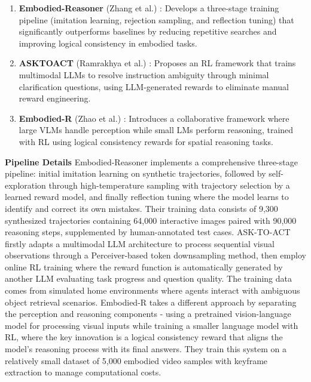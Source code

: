 \documentclass[10pt,twocolumn]{article}
\begin{document}
\begin{enumerate}[leftmargin=*,noitemsep,topsep=0pt]
    \item \textbf{Embodied-Reasoner} (Zhang et al.) \cite{embodied-reasoner}: Develops a three-stage training pipeline (imitation learning, rejection sampling, and reflection tuning) that significantly outperforms baselines by reducing repetitive searches and improving logical consistency in embodied tasks.
    \item \textbf{ASKTOACT} (Ramrakhya et al.) \cite{ramrakhya2025groundingmultimodalllmsembodied}: Proposes an RL framework that trains multimodal LLMs to resolve instruction ambiguity through minimal clarification questions, using LLM-generated rewards to eliminate manual reward engineering.
    \item \textbf{Embodied-R} (Zhao et al.) \cite{zhao2025embodiedr}: Introduces a collaborative framework where large VLMs handle perception while small LMs perform reasoning, trained with RL using logical consistency rewards for spatial reasoning tasks.
    
    
\end{enumerate}
\textbf{Pipeline Details} 
Embodied-Reasoner implements a comprehensive three-stage pipeline: initial imitation learning on synthetic trajectories, followed by self-exploration through high-temperature sampling with trajectory selection by a learned reward model, and finally reflection tuning where the model learns to identify and correct its own mistakes. Their training data consists of 9,300 synthesized trajectories containing 64,000 interactive images paired with 90,000 reasoning steps, supplemented by human-annotated test cases.
ASK-TO-ACT firstly adapts a multimodal LLM architecture to process sequential visual observations through a Perceiver-based token downsampling method, then employ online RL training where the reward function is automatically generated by another LLM evaluating task progress and question quality. The training data comes from simulated home environments where agents interact with ambiguous object retrieval scenarios. Embodied-R takes a different approach by separating the perception and reasoning components - using a pretrained vision-language model for processing visual inputs while training a smaller language model with RL, where the key innovation is a logical consistency reward that aligns the model's reasoning process with its final answers. They train this system on a relatively small dataset of 5,000 embodied video samples with keyframe extraction to manage computational costs. 
\end{document}
